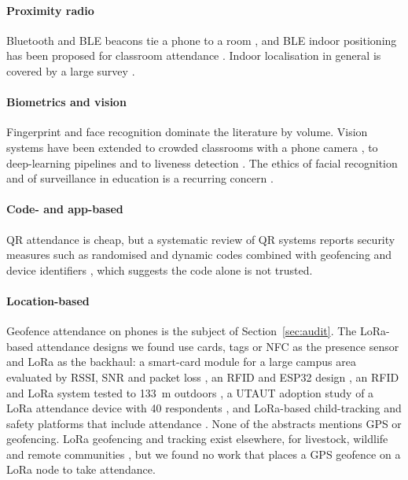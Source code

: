 \documentclass[preprint,12pt]{elsarticle}
\begin{document}
\paragraph{Proximity radio} Bluetooth and BLE beacons tie a phone to a room \cite{@159,@165}, and BLE indoor positioning has been proposed for classroom attendance \cite{@209}. Indoor localisation in general is covered by a large survey \cite{@0}.

\paragraph{Biometrics and vision} Fingerprint \cite{@47,@168,@142} and face recognition \cite{@16,@33,@65,@71,@78} dominate the literature by volume. Vision systems have been extended to crowded classrooms with a phone camera \cite{@242}, to deep-learning pipelines \cite{@300} and to liveness detection \cite{@226}. The ethics of facial recognition and of surveillance in education is a recurring concern \cite{@21,@645}.

\paragraph{Code- and app-based} QR attendance \cite{@61} is cheap, but a systematic review of QR systems reports security measures such as randomised and dynamic codes combined with geofencing and device identifiers \cite{@1065}, which suggests the code alone is not trusted.

\paragraph{Location-based} Geofence attendance on phones is the subject of Section~\ref{sec:audit}. The LoRa-based attendance designs we found use cards, tags or NFC as the presence sensor and LoRa as the backhaul: a smart-card module for a large campus area evaluated by RSSI, SNR and packet loss \cite{@850}, an RFID and ESP32 design \cite{@1354}, an RFID and LoRa system tested to 133~m outdoors \cite{@1355}, a UTAUT adoption study of a LoRa attendance device with 40 respondents \cite{@1353}, and LoRa-based child-tracking and safety platforms that include attendance \cite{@851,@1000}. None of the abstracts mentions GPS or geofencing. LoRa geofencing and tracking exist elsewhere, for livestock, wildlife and remote communities \cite{@357,@1235,@1870,lopezescobar2025wildlife}, but we found no work that places a GPS geofence on a LoRa node to take attendance.
\end{document}
